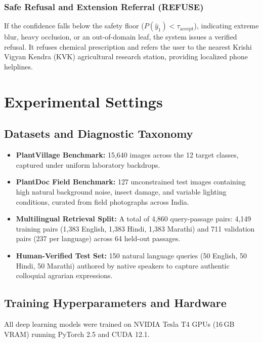 \documentclass[conference]{IEEEtran}
\begin{document}
\subsubsection{Safe Refusal and Extension Referral (REFUSE)}
If the confidence falls below the safety floor ($P(\hat{y}_1) < \tau_{\text{accept}}$), indicating extreme blur, heavy occlusion, or an out-of-domain leaf, the system issues a verified refusal. It refuses chemical prescription and refers the user to the nearest Krishi Vigyan Kendra (KVK) agricultural research station, providing localized phone helplines.

\section{Experimental Settings}
\label{sec:experiments}

\subsection{Datasets and Diagnostic Taxonomy}
\begin{itemize}
    \item \textbf{PlantVillage Benchmark:} 15,640 images across the 12 target classes, captured under uniform laboratory backdrops.
    \item \textbf{PlantDoc Field Benchmark:} 127 unconstrained test images containing high natural background noise, insect damage, and variable lighting conditions, curated from field photographs across India.
    \item \textbf{Multilingual Retrieval Split:} A total of 4,860 query-passage pairs: 4,149 training pairs (1,383 English, 1,383 Hindi, 1,383 Marathi) and 711 validation pairs (237 per language) across 64 held-out passages.
    \item \textbf{Human-Verified Test Set:} 150 natural language queries (50 English, 50 Hindi, 50 Marathi) authored by native speakers to capture authentic colloquial agrarian expressions.
\end{itemize}

\subsection{Training Hyperparameters and Hardware}
All deep learning models were trained on NVIDIA Tesla T4 GPUs (16\,GB VRAM) running PyTorch 2.5 and CUDA 12.1. 
\end{document}

